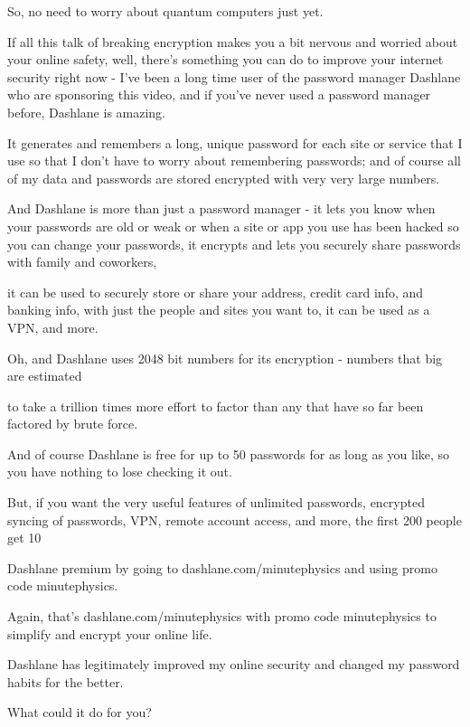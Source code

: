 \documentclass[../main.tex]{subfiles}
\begin{document}
So, no need to worry about quantum computers just yet.

If all this talk of breaking encryption makes you a bit nervous and worried about your online safety, well, there’s something you can do to improve your internet security right now - I’ve been a long time user of the password manager Dashlane who are sponsoring this video, and if you’ve never used a password manager before, Dashlane is amazing.

It generates and remembers a long, unique password for each site or service that I use so that I don’t have to worry about remembering passwords; and of course all of my data and passwords are stored encrypted with very very large numbers.

And Dashlane is more than just a password manager - it lets you know when your passwords are old or weak or when a site or app you use has been hacked so you can change your passwords, it encrypts and lets you securely share passwords with family and coworkers,

it can be used to securely store or share your address, credit card info, and banking info, with just the people and sites you want to, it can be used as a VPN, and more.

Oh, and Dashlane uses 2048 bit numbers for its encryption - numbers that big are estimated

to take a trillion times more effort to factor than any that have so far been factored by brute force.

And of course Dashlane is free for up to 50 passwords for as long as you like, so you have nothing to lose checking it out.

But, if you want the very useful features of unlimited passwords, encrypted syncing of passwords, VPN, remote account access, and more, the first 200 people get 10%

Dashlane premium by going to dashlane.com/minutephysics and using promo code minutephysics.

Again, that’s dashlane.com/minutephysics with promo code minutephysics to simplify and encrypt your online life.

Dashlane has legitimately improved my online security and changed my password habits for the better.

What could it do for you?
\end{document}
